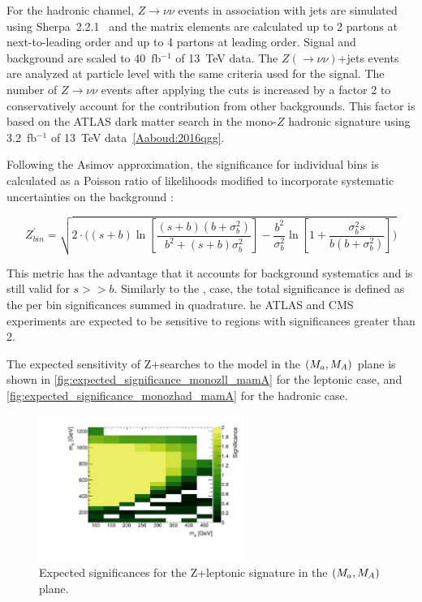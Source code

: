 For the hadronic channel, $Z \to \nu\nu$ events in association with jets are simulated using Sherpa~2.2.1~\cite{Gleisberg:2008ta} and the matrix elements are calculated up to 2 partons at next-to-leading order and up to 4 partons at leading order. Signal and background are scaled to 40~fb$^{-1}$ of 13~TeV data.
The $Z (\to \nu\nu)$+jets events are analyzed at particle level with the same criteria used for the signal. 
The number of $Z \to \nu\nu$ events after applying the cuts is increased by a factor 2 to conservatively account for the contribution from other backgrounds. 
This factor is based on the ATLAS dark matter search in the mono-$Z$ hadronic signature using 3.2~fb$^{-1}$ of 13~TeV data~\ref{Aaboud:2016qgg}. 

Following the Asimov approximation, the significance for individual bins is calculated as a Poisson ratio of likelihoods modified to incorporate systematic uncertainties on the background \cite{Cowan:2012}:  

\begin{equation}
\label{eq:significance_wsyst}
Z^\prime_{bin} = \sqrt{ 2 \cdot \bigg( (s+b) \ln[\frac{ (s+b) (b+\sigma_b^2) } {b^2 + (s+b) \sigma_b^2} ]- \frac{b^2}{\sigma_b^2} \ln[1 + \frac{\sigma_b^2 s}{b(b+\sigma_b^2)} ] \bigg) }
\end{equation}

This metric has the advantage that it accounts for background systematics and is still valid for $s >> b$.  
Similarly to the \monohbb, case, the total significance is defined as the per bin significances summed in quadrature.
 he ATLAS and CMS experiments are expected to be sensitive to regions with significances greater than 2.
 
The expected sensitivity of Z+\MET searches to the \hdma model in the $(M_{a},M_{A})$ plane is shown in \autoref{fig:expected_significance_monozll_mamA} for the leptonic case, and \autoref{fig:expected_significance_monozhad_mamA} for the hadronic case.

\begin{figure}
\centering
\includegraphics[width=0.6\textwidth]{texinputs/04_grid/figures/monoz/leptonic/mAma_Significance_ll.pdf}
\caption{Expected significances for the Z+\MET leptonic signature in the $(M_{a},M_{A})$ plane.} 
\label{fig:expected_significance_monozll_mamA}
\end{figure}

